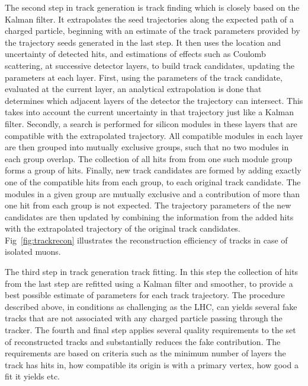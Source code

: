 The second step in track generation is track finding which is closely based on the Kalman filter. It extrapolates the seed trajectories along the expected path of a charged particle, beginning with an estimate of the track parameters provided by the trajectory seeds generated in the last step. It then uses the location and uncertainty of detected hits, and estimations of effects such as Coulomb scattering, at successive detector layers, to build track candidates, updating the parameters at each layer. First, using the parameters of the track candidate, evaluated at the current layer, an analytical extrapolation is done that determines which adjacent layers of the detector the trajectory can intersect. This takes into account the current uncertainty in that trajectory just like a Kalman filter. Secondly, a search is performed for silicon modules in these layers that are compatible with the extrapolated trajectory. All compatible modules in each layer are then grouped into mutually exclusive groups, such that no two modules in each group overlap. The collection of all hits from from one such module group forms a group of hits. Finally, new track candidates are formed by adding exactly one of the compatible hits from each group, to each original track candidate. The modules in a given group are mutually exclusive and a contribution of more than one hit from each group is not expected. The trajectory parameters of the new candidates are then updated by combining the information from the added hits with the extrapolated trajectory of the original track candidates. Fig~\ref{fig:trackrecon} illustrates the reconstruction efficiency of tracks in case of isolated muons.

The third step in track generation track fitting. In this step the collection of hits from the last step are refitted using a Kalman filter and smoother, to provide a best possible estimate of parameters for each track trajectory. The procedure described above, in conditions as challenging as the LHC, can yields several fake tracks that are not associated with any charged particle passing through the tracker. The fourth and final step applies several quality requirements to the set of reconstructed tracks and substantially reduces the fake contribution. The requirements are based on criteria such as the minimum number of layers the track has hits in, how compatible its origin is with a primary vertex, how good a fit it yields etc.

